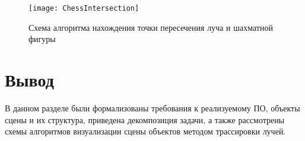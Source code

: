 \begin{figure}[H]
	\centering
	\texttt{[image: ChessIntersection]}
	\caption{Схема алгоритма нахождения точки пересечения луча и шахматной фигуры}
	\label{fig:ChessIntersection}
\end{figure}

\section{Вывод}
В данном разделе были формализованы требования к реализуемому ПО, объекты сцены и их структура, приведена декомпозиция задачи, а также рассмотрены схемы алгоритмов визуализации сцены объектов методом трассировки лучей.

\clearpage
